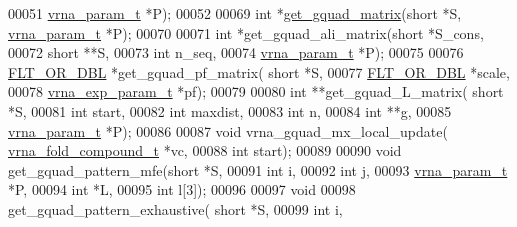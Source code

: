 \begin{DoxyCode}
00051                             \hyperlink{group__energy__parameters_structvrna__param__s}{vrna\_param\_t} *P);
00052 
00069 \textcolor{keywordtype}{int}         *\hyperlink{group__gquads_ga392e45c9615aa123737671603fa4203c}{get\_gquad\_matrix}(\textcolor{keywordtype}{short} *S, \hyperlink{group__energy__parameters_structvrna__param__s}{vrna\_param\_t} *P);
00070 
00071 \textcolor{keywordtype}{int}         *get\_gquad\_ali\_matrix(\textcolor{keywordtype}{short} *S\_cons,
00072                                   \textcolor{keywordtype}{short} **S,
00073                                   \textcolor{keywordtype}{int} n\_seq,
00074                                   \hyperlink{group__energy__parameters_structvrna__param__s}{vrna\_param\_t} *P);
00075 
00076 \hyperlink{group__data__structures_ga31125aeace516926bf7f251f759b6126}{FLT\_OR\_DBL}  *get\_gquad\_pf\_matrix( \textcolor{keywordtype}{short} *S,
00077                                   \hyperlink{group__data__structures_ga31125aeace516926bf7f251f759b6126}{FLT\_OR\_DBL} *scale,
00078                                   \hyperlink{group__energy__parameters_structvrna__exp__param__s}{vrna\_exp\_param\_t} *pf);
00079 
00080 \textcolor{keywordtype}{int}         **get\_gquad\_L\_matrix( \textcolor{keywordtype}{short} *S,
00081                                   \textcolor{keywordtype}{int} start,
00082                                   \textcolor{keywordtype}{int} maxdist,
00083                                   \textcolor{keywordtype}{int} n,
00084                                   \textcolor{keywordtype}{int} **g,
00085                                   \hyperlink{group__energy__parameters_structvrna__param__s}{vrna\_param\_t} *P);
00086 
00087 \textcolor{keywordtype}{void}        vrna\_gquad\_mx\_local\_update( \hyperlink{group__fold__compound_structvrna__fc__s}{vrna\_fold\_compound\_t} *vc,
00088                                         \textcolor{keywordtype}{int} start);
00089 
00090 \textcolor{keywordtype}{void}        get\_gquad\_pattern\_mfe(\textcolor{keywordtype}{short} *S,
00091                                   \textcolor{keywordtype}{int} i,
00092                                   \textcolor{keywordtype}{int} j,
00093                                   \hyperlink{group__energy__parameters_structvrna__param__s}{vrna\_param\_t} *P,
00094                                   \textcolor{keywordtype}{int} *L,
00095                                   \textcolor{keywordtype}{int} l[3]);
00096 
00097 \textcolor{keywordtype}{void}
00098 get\_gquad\_pattern\_exhaustive( \textcolor{keywordtype}{short} *S,
00099                               \textcolor{keywordtype}{int} i,

\end{DoxyCode}
